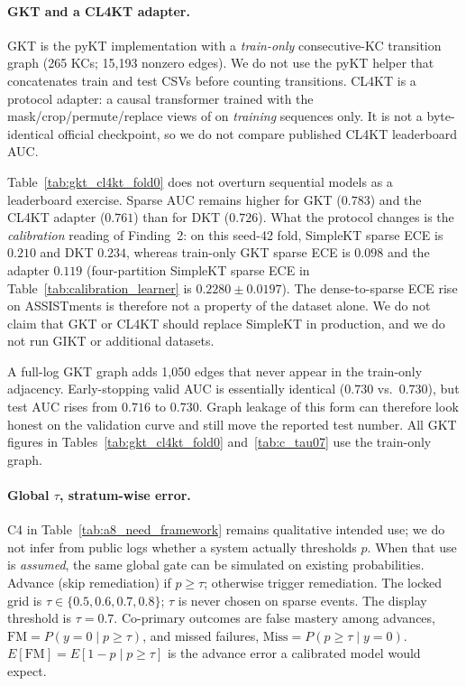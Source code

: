 \paragraph{GKT and a CL4KT adapter.}
GKT \citep{nakagawa2019graph} is the pyKT implementation with a \emph{train-only} consecutive-KC transition graph (265 KCs; 15{,}193 nonzero edges). We do not use the pyKT helper that concatenates train and test CSVs before counting transitions. CL4KT is a protocol adapter: a causal transformer trained with the mask/crop/permute/replace views of \citet{lee2022cl4kt} on \emph{training} sequences only. It is not a byte-identical official checkpoint, so we do not compare published CL4KT leaderboard AUC.

Table~\ref{tab:gkt_cl4kt_fold0} does not overturn sequential models as a leaderboard exercise. Sparse AUC remains higher for GKT ($0.783$) and the CL4KT adapter ($0.761$) than for DKT ($0.726$). What the protocol changes is the \emph{calibration} reading of Finding~2: on this seed-42 fold, SimpleKT sparse ECE is $0.210$ and DKT $0.234$, whereas train-only GKT sparse ECE is $0.098$ and the adapter $0.119$ (four-partition SimpleKT sparse ECE in Table~\ref{tab:calibration_learner} is $0.2280\pm 0.0197$). The dense-to-sparse ECE rise on ASSISTments is therefore not a property of the dataset alone. We do not claim that GKT or CL4KT should replace SimpleKT in production, and we do not run GIKT or additional datasets.

A full-log GKT graph adds 1{,}050 edges that never appear in the train-only adjacency. Early-stopping valid AUC is essentially identical ($0.730$ vs.\ $0.730$), but test AUC rises from $0.716$ to $0.730$. Graph leakage of this form can therefore look honest on the validation curve and still move the reported test number. All GKT figures in Tables~\ref{tab:gkt_cl4kt_fold0} and~\ref{tab:c_tau07} use the train-only graph.



\paragraph{Global $\tau$, stratum-wise error.}
C4 in Table~\ref{tab:a8_need_framework} remains qualitative intended use; we do not infer from public logs whether a system actually thresholds $p$. When that use is \emph{assumed}, the same global gate can be simulated on existing probabilities. Advance (skip remediation) if $p\ge\tau$; otherwise trigger remediation. The locked grid is $\tau\in\{0.5,0.6,0.7,0.8\}$; $\tau$ is never chosen on sparse events. The display threshold is $\tau=0.7$. Co-primary outcomes are false mastery among advances, $\mathrm{FM}=P(y=0\mid p\ge\tau)$, and missed failures, $\mathrm{Miss}=P(p\ge\tau\mid y=0)$. $E[\mathrm{FM}]=E[1-p\mid p\ge\tau]$ is the advance error a calibrated model would expect.

